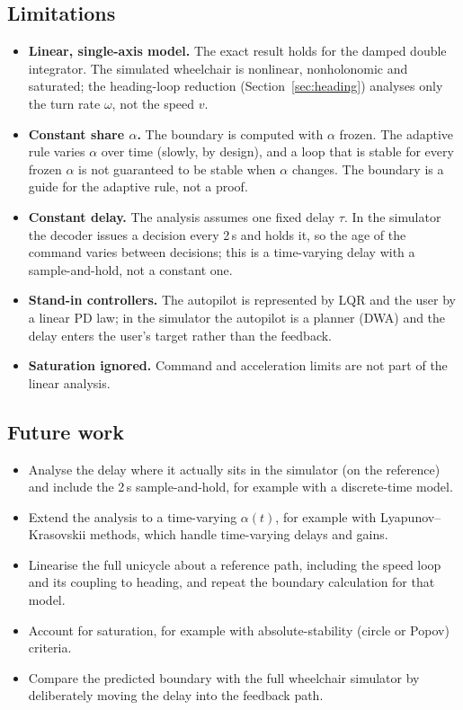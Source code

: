 \documentclass[11pt,a4paper]{article}
\theoremstyle{definition}
\begin{document}
\subsection{Limitations}
\begin{itemize}\setlength{\itemsep}{2pt}
\item \textbf{Linear, single-axis model.} The exact result holds for the
damped double integrator. The simulated wheelchair is nonlinear,
nonholonomic and saturated; the heading-loop reduction
(Section~\ref{sec:heading}) analyses only the turn rate $\omega$, not
the speed $v$.
\item \textbf{Constant share $\alpha$.} The boundary is computed with
$\alpha$ frozen. The adaptive rule varies $\alpha$ over time (slowly, by
design), and a loop that is stable for every frozen $\alpha$ is not
guaranteed to be stable when $\alpha$ changes. The boundary is a guide
for the adaptive rule, not a proof.
\item \textbf{Constant delay.} The analysis assumes one fixed delay
$\tau$. In the simulator the decoder issues a decision every 2\,s and
holds it, so the age of the command varies between decisions; this is a
time-varying delay with a sample-and-hold, not a constant one.
\item \textbf{Stand-in controllers.} The autopilot is represented by LQR
and the user by a linear PD law; in the simulator the autopilot is a
planner (DWA) and the delay enters the user's target rather than the
feedback.
\item \textbf{Saturation ignored.} Command and acceleration limits are
not part of the linear analysis.
\end{itemize}

\subsection{Future work}
\begin{itemize}\setlength{\itemsep}{2pt}
\item Analyse the delay where it actually sits in the simulator (on the
reference) and include the 2\,s sample-and-hold, for example with a
discrete-time model.
\item Extend the analysis to a time-varying $\alpha(t)$, for example with
Lyapunov--Krasovskii methods, which handle time-varying delays and
gains.
\item Linearise the full unicycle about a reference path, including the
speed loop and its coupling to heading, and repeat the boundary
calculation for that model.
\item Account for saturation, for example with absolute-stability
(circle or Popov) criteria.
\item Compare the predicted boundary with the full wheelchair simulator
by deliberately moving the delay into the feedback path.
\end{itemize}
\end{document}
